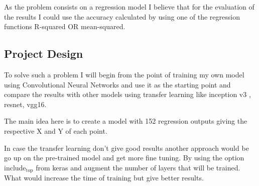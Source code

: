 \documentclass[11pt]{article}
\begin{document}
As the problem consists on a regression model I believe that for the
evaluation of the results I could use the accuracy calculated by using one
of the regression functions R-squared OR mean-squared.

\subsection{Project Design}
\label{sec:org3b4fa7e}

To solve such a problem I will begin from the point of training my own model
using Convolutional Neural Networks and use it as the starting point and compare
the results with other models using transfer learning like inception v3 , resnet, vgg16.

The main idea here is to create a model with 152 regression outputs giving
the respective X and Y of each point.

In case the transfer learning don't give good results another approach would
be go up on the pre-trained model and get more fine tuning.
By using the option include\(_{\text{top}}\) from keras and augment the number of layers
that will be trained. What would increase the time of training but give better results.





\end{document}
